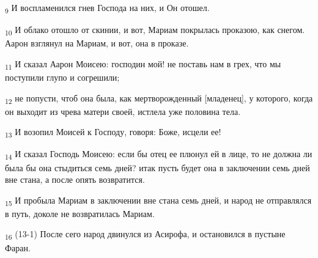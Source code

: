 \begin{tcolorbox}
\textsubscript{9} И воспламенился гнев Господа на них, и Он отошел.
\end{tcolorbox}
\begin{tcolorbox}
\textsubscript{10} И облако отошло от скинии, и вот, Мариам покрылась проказою, как снегом. Аарон взглянул на Мариам, и вот, она в проказе.
\end{tcolorbox}
\begin{tcolorbox}
\textsubscript{11} И сказал Аарон Моисею: господин мой! не поставь нам в грех, что мы поступили глупо и согрешили;
\end{tcolorbox}
\begin{tcolorbox}
\textsubscript{12} не попусти, чтоб она была, как мертворожденный [младенец], у которого, когда он выходит из чрева матери своей, истлела уже половина тела.
\end{tcolorbox}
\begin{tcolorbox}
\textsubscript{13} И возопил Моисей к Господу, говоря: Боже, исцели ее!
\end{tcolorbox}
\begin{tcolorbox}
\textsubscript{14} И сказал Господь Моисею: если бы отец ее плюнул ей в лице, то не должна ли была бы она стыдиться семь дней? итак пусть будет она в заключении семь дней вне стана, а после опять возвратится.
\end{tcolorbox}
\begin{tcolorbox}
\textsubscript{15} И пробыла Мариам в заключении вне стана семь дней, и народ не отправлялся в путь, доколе не возвратилась Мариам.
\end{tcolorbox}
\begin{tcolorbox}
\textsubscript{16} (13-1) После сего народ двинулся из Асирофа, и остановился в пустыне Фаран.
\end{tcolorbox}
